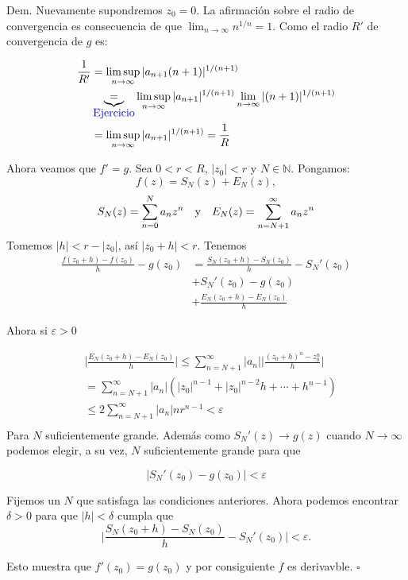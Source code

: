 \documentclass{article}
\newenvironment{demo}{\noindent\emph{Dem.}}{{\hspace*{\fill}$\square$} \newline\vspace{5pt}}
\renewcommand{\emph}[1]{\textcolor[rgb]{0,0,1}{#1}}
\renewcommand{\epsilon}{\varepsilon}
\begin{document}
\begin{demo} Nuevamente supondremos $z_0=0$. La afirmación sobre el radio de convergencia es consecuencia de que $\lim_{n\to\infty}n^{1/n}=1$. Como el radio $R'$ de convergencia de $g$ es:

\[
\begin{split}
\frac{1}{R'}&=\limsup_{n\to\infty}|a_{n+1}(n+1)|^{1/(n+1)}\\
&\underbrace{=}_{\hbox{\emph{ Ejercicio}}}\limsup_{n\to\infty}|a_{n+1}|^{1/(n+1)}\lim_{n\to\infty}|(n+1)|^{1/(n+1)}\\
&=\limsup_{n\to\infty}|a_{n+1}|^{1/(n+1)}=\frac{1}{R}
\end{split}\]

Ahora veamos que  $f'=g$.   Sea $0<r<R$, $|z_0|<r$ y $N\in\mathbb{N}$. Pongamos:
\[f(z)=S_N(z)+E_N(z),\]
\[S_N(z)=\sum_{n=0}^{N}a_nz^n\quad\hbox{y}\quad E_N(z)=\sum_{n=N+1}^{\infty}a_nz^n\]
Tomemos $|h|<r-|z_0|$, así $|z_0+h|<r$.  Tenemos
\[\begin{split}
\frac{f(z_0+h)-f(z_0)}{h}-g(z_0)&= \frac{S_N(z_0+h)-S_N(z_0)}{h}-S_N'(z_0)\\
				&+S_N'(z_0)-g(z_0)\\
				&+\frac{E_N(z_0+h)-E_N(z_0)}{h}
\end{split}\]

Ahora si $\epsilon>0$

\[\begin{split}
				&\bigg|\frac{E_N(z_0+h)-E_N(z_0)}{h}\bigg|\leq\sum_{n=N+1}^{\infty}|a_n|\bigg|\frac{(z_0+h)^n-z_0^n}{h}\bigg|\\
				&=\sum_{n=N+1}^{\infty}|a_n|(|z_0|^{n-1}+|z_0|^{n-2}h+\cdots+h^{n-1})\\
				&\leq2\sum_{n=N+1}^{\infty}|a_n|nr^{n-1}<\epsilon\\
\end{split}\]
Para $N$ suficientemente grande. Además como $S_N'(z)\to g(z)$ cuando $N\to\infty$ podemos elegir, a su vez, $N$ suficientemente grande para que

\[
	|S_N'(z_0)-g(z_0)|<\epsilon
\]

 Fijemos un $N$ que satisfaga las condiciones anteriores. Ahora podemos encontrar $\delta>0$ para que $|h|<\delta$ cumpla que 
\[
\bigg|\frac{S_N(z_0+h)-S_N(z_0)}{h}-S_N'(z_0)\bigg|<\epsilon.
\]

Esto muestra que $f'(z_0)=g(z_0)$ y por consiguiente $f$ es derivavble.  
\end{demo}


 
\end{document}
